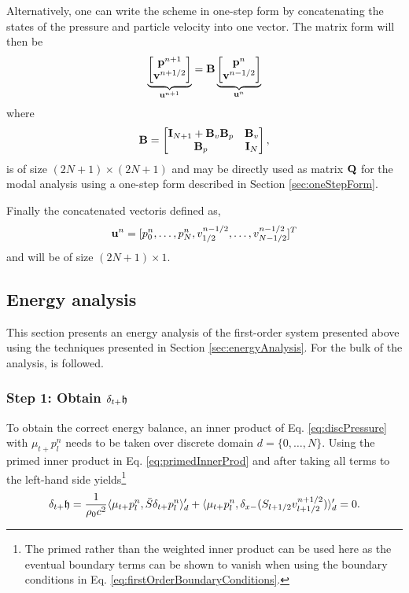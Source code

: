 {Alternatively, one can write the scheme in one-step form by concatenating the states of the pressure and particle velocity into one vector. The matrix form will then be 
\begin{equation}
    \underbrace{\begin{bmatrix}
        \mathbf{p}^{n+1}\\
        \mathbf{v}^{n+1/2}
    \end{bmatrix}}_{\mathbf{u}^{n+1}} = \mathbf{B}\underbrace{\begin{bmatrix}
        \mathbf{p}^{n}\\
        \mathbf{v}^{n-1/2}
    \end{bmatrix}}_{\mathbf{u}^{n}} 
\end{equation}
where
\begin{equation}
    \mathbf{B} = \begin{bmatrix}
        \mathbf{I}_{N+1}+\mathbf{B}_v\mathbf{B}_p & \mathbf{B}_v  \\
        \mathbf{B}_p & \mathbf{I}_{N}
    \end{bmatrix},
\end{equation}
is of size $(2N + 1) \times (2N + 1)$ and may be directly used as matrix $\mathbf{Q}$ for the modal analysis using a one-step form described in Section \ref{sec:oneStepForm}.

Finally the concatenated vectoris defined as,
\begin{equation}
    \mathbf{u}^n = [p_0^n, \hdots, p_N^n, v_{1/2}^{n-1/2}, \hdots, v_{N-1/2}^{n-1/2}]^T
\end{equation}
and will be of size $(2N + 1) \times 1$. 

\subsection{Energy analysis}
This section presents an energy analysis of the first-order system presented above using the techniques presented in Section \ref{sec:energyAnalysis}. For the bulk of the analysis, \cite{Harrison2018} is followed. 

\subsubsection{Step 1: Obtain $\delta_{t+} \mathfrak{h}$}
To obtain the correct energy balance, an inner product of Eq. \eqref{eq:discPressure} with $\mu_{t+}p_l^n$ needs to be taken over discrete domain $d = \{0, \hdots, N\}$. Using the primed inner product in Eq. \eqref{eq:primedInnerProd} and after taking all terms to the left-hand side yields\footnote{The primed rather than the weighted inner product can be used here as the eventual boundary terms can be shown to vanish when using the boundary conditions in Eq. \eqref{eq:firstOrderBoundaryConditions}.}
\begin{equation}\label{eq:firstOrderPrimed}
    \delta_{t+}\mathfrak{h} = \frac{1}{\rho_0 c^2}\langle \mu_{t+}p_l^n, \bar{S} \delta_{t+}p_l^n \rangle_{d}' +\langle \mu_{t+}p_l^n, \delta_{x-}(S_{l+1/2}v_{l+1/2}^{n+1/2})\rangle_{d}' = 0.
\end{equation}


}
